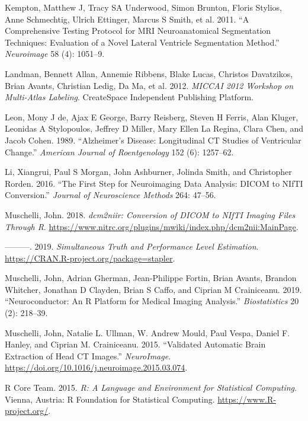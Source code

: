 \documentclass[]{elsarticle} %
\newlength{\cslhangindent}
\newenvironment{cslreferences}%
  {\setlength{\parindent}{0pt}%
  \everypar{\setlength{\hangindent}{\cslhangindent}}\ignorespaces}%
  {\par}
\begin{document}
\begin{cslreferences}
\leavevmode\hypertarget{ref-alvin}{}%
Kempton, Matthew J, Tracy SA Underwood, Simon Brunton, Floris Stylios, Anne Schmechtig, Ulrich Ettinger, Marcus S Smith, et al. 2011. ``A Comprehensive Testing Protocol for MRI Neuroanatomical Segmentation Techniques: Evaluation of a Novel Lateral Ventricle Segmentation Method.'' \emph{Neuroimage} 58 (4): 1051--9.

\leavevmode\hypertarget{ref-bennett2012miccai}{}%
Landman, Bennett Allan, Annemie Ribbens, Blake Lucas, Christos Davatzikos, Brian Avants, Christian Ledig, Da Ma, et al. 2012. \emph{MICCAI 2012 Workshop on Multi-Atlas Labeling}. CreateSpace Independent Publishing Platform.

\leavevmode\hypertarget{ref-de1989alzheimer}{}%
Leon, Mony J de, Ajax E George, Barry Reisberg, Steven H Ferris, Alan Kluger, Leonidas A Stylopoulos, Jeffrey D Miller, Mary Ellen La Regina, Clara Chen, and Jacob Cohen. 1989. ``Alzheimer's Disease: Longitudinal CT Studies of Ventricular Change.'' \emph{American Journal of Roentgenology} 152 (6): 1257--62.

\leavevmode\hypertarget{ref-dcm2niix}{}%
Li, Xiangrui, Paul S Morgan, John Ashburner, Jolinda Smith, and Christopher Rorden. 2016. ``The First Step for Neuroimaging Data Analysis: DICOM to NIfTI Conversion.'' \emph{Journal of Neuroscience Methods} 264: 47--56.

\leavevmode\hypertarget{ref-dcm2niir}{}%
Muschelli, John. 2018. \emph{dcm2niir: Conversion of DICOM to NIfTI Imaging Files Through R}. \url{https://www.nitrc.org/plugins/mwiki/index.php/dcm2nii:MainPage}.

\leavevmode\hypertarget{ref-stapler}{}%
---------. 2019. \emph{Simultaneous Truth and Performance Level Estimation}. \url{https://CRAN.R-project.org/package=stapler}.

\leavevmode\hypertarget{ref-neuroconductor}{}%
Muschelli, John, Adrian Gherman, Jean-Philippe Fortin, Brian Avants, Brandon Whitcher, Jonathan D Clayden, Brian S Caffo, and Ciprian M Crainiceanu. 2019. ``Neuroconductor: An R Platform for Medical Imaging Analysis.'' \emph{Biostatistics} 20 (2): 218--39.

\leavevmode\hypertarget{ref-muschelli_validated_2015}{}%
Muschelli, John, Natalie L. Ullman, W. Andrew Mould, Paul Vespa, Daniel F. Hanley, and Ciprian M. Crainiceanu. 2015. ``Validated Automatic Brain Extraction of Head CT Images.'' \emph{NeuroImage}. \url{https://doi.org/10.1016/j.neuroimage.2015.03.074}.

\leavevmode\hypertarget{ref-RCORE}{}%
R Core Team. 2015. \emph{R: A Language and Environment for Statistical Computing}. Vienna, Austria: R Foundation for Statistical Computing. \url{https://www.R-project.org/}.


\end{cslreferences}
\end{document}
